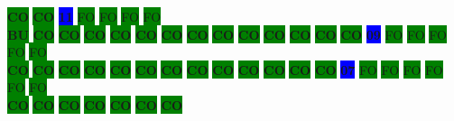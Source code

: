 \colorbox{green}{\color[rgb]{0,0,0}\textbf{CO}}%
\colorbox{green}{\color[rgb]{0,0,0}\textbf{CO}}%
\colorbox{blue}{\color[rgb]{1,0,0}\textbf{11}}%
\colorbox{green}{\color[gray]{0.75}FO}%
\colorbox{green}{\color[gray]{0.75}FO}%
\colorbox{green}{\color[gray]{0.75}FO}%
\colorbox{green}{\color[gray]{0.75}FO}%
\\
\colorbox{green}{\color[rgb]{1,0,0}\textbf{BU}}%
\colorbox{green}{\color[rgb]{0,0,0}\textbf{CO}}%
\colorbox{green}{\color[rgb]{0,0,0}\textbf{CO}}%
\colorbox{green}{\color[rgb]{0,0,0}\textbf{CO}}%
\colorbox{green}{\color[rgb]{0,0,0}\textbf{CO}}%
\colorbox{green}{\color[rgb]{0,0,0}\textbf{CO}}%
\colorbox{green}{\color[rgb]{0,0,0}\textbf{CO}}%
\colorbox{green}{\color[rgb]{0,0,0}\textbf{CO}}%
\colorbox{green}{\color[rgb]{0,0,0}\textbf{CO}}%
\colorbox{green}{\color[rgb]{0,0,0}\textbf{CO}}%
\colorbox{green}{\color[rgb]{0,0,0}\textbf{CO}}%
\colorbox{green}{\color[rgb]{0,0,0}\textbf{CO}}%
\colorbox{green}{\color[rgb]{0,0,0}\textbf{CO}}%
\colorbox{green}{\color[rgb]{0,0,0}\textbf{CO}}%
\colorbox{blue}{\color[rgb]{1,0,0}\textbf{09}}%
\colorbox{green}{\color[gray]{0.75}FO}%
\colorbox{green}{\color[gray]{0.75}FO}%
\colorbox{green}{\color[gray]{0.75}FO}%
\colorbox{green}{\color[gray]{0.75}FO}%
\colorbox{green}{\color[gray]{0.75}FO}%
\\
\colorbox{green}{\color[rgb]{0,0,0}\textbf{CO}}%
\colorbox{green}{\color[rgb]{0,0,0}\textbf{CO}}%
\colorbox{green}{\color[rgb]{0,0,0}\textbf{CO}}%
\colorbox{green}{\color[rgb]{0,0,0}\textbf{CO}}%
\colorbox{green}{\color[rgb]{0,0,0}\textbf{CO}}%
\colorbox{green}{\color[rgb]{0,0,0}\textbf{CO}}%
\colorbox{green}{\color[rgb]{0,0,0}\textbf{CO}}%
\colorbox{green}{\color[rgb]{0,0,0}\textbf{CO}}%
\colorbox{green}{\color[rgb]{0,0,0}\textbf{CO}}%
\colorbox{green}{\color[rgb]{0,0,0}\textbf{CO}}%
\colorbox{green}{\color[rgb]{0,0,0}\textbf{CO}}%
\colorbox{green}{\color[rgb]{0,0,0}\textbf{CO}}%
\colorbox{green}{\color[rgb]{0,0,0}\textbf{CO}}%
\colorbox{blue}{\color[rgb]{1,0,0}\textbf{07}}%
\colorbox{green}{\color[gray]{0.75}FO}%
\colorbox{green}{\color[gray]{0.75}FO}%
\colorbox{green}{\color[gray]{0.75}FO}%
\colorbox{green}{\color[gray]{0.75}FO}%
\colorbox{green}{\color[gray]{0.75}FO}%
\colorbox{green}{\color[gray]{0.75}FO}%
\\
\colorbox{green}{\color[rgb]{0,0,0}\textbf{CO}}%
\colorbox{green}{\color[rgb]{0,0,0}\textbf{CO}}%
\colorbox{green}{\color[rgb]{0,0,0}\textbf{CO}}%
\colorbox{green}{\color[rgb]{0,0,0}\textbf{CO}}%
\colorbox{green}{\color[rgb]{0,0,0}\textbf{CO}}%
\colorbox{green}{\color[rgb]{0,0,0}\textbf{CO}}%
\colorbox{green}{\color[rgb]{0,0,0}\textbf{CO}}%

